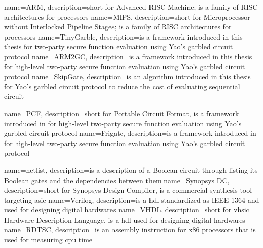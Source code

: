{
  name=ARM,
  description={short for Advanced RISC Machine; is a family of RISC architectures for processors}
}
{
  name=MIPS,
  description={short for Microprocessor without Interlocked Pipeline Stages; is a family of RISC architectures for processors}
}
{
  name=TinyGarble,
  description={is a framework introduced in this thesis for two-party secure function evaluation using Yao's garbled circuit protocol}
}
{
  name=ARM2GC,
  description={is a framework introduced in this thesis for high-level two-party secure function evaluation using Yao's garbled circuit protocol}
}
{
  name=SkipGate,
  description={is an algorithm introduced in this thesis for Yao's garbled circuit protocol to reduce the cost of evaluating sequential circuit}
}

{
  name=PCF,
  description={short for Portable Circuit Format, is a framework introduced in \cite{kreuter2013pcf} for high-level two-party secure function evaluation using Yao's garbled circuit protocol}
}
{
  name=Frigate,
  description={is a framework introduced in \cite{mood2016frigate} for high-level two-party secure function evaluation using Yao's garbled circuit protocol}
}

{
  name=netlist,
  description={is a description of a Boolean circuit through listing its Boolean gates and the dependencies between them}
}
{
  name=Synopsys DC,
  description={short for Synopsys Design Compiler, is a commercial synthesis tool targeting \acrfull{asic}}
}
{
  name=Verilog,
  description={is a \acrfull{hdl} standardized as IEEE 1364 and used for designing digital hardwares}
}
{
  name=VHDL,
  description={short for \acrshort{vhsic} Hardware Description Language, is a \acrfull{hdl} used for designing digital hardwares}
}
{
  name=RDTSC,
  description={is an assembly instruction for x86 processors that is used for measuring \acrshort{cpu} time} 
}
